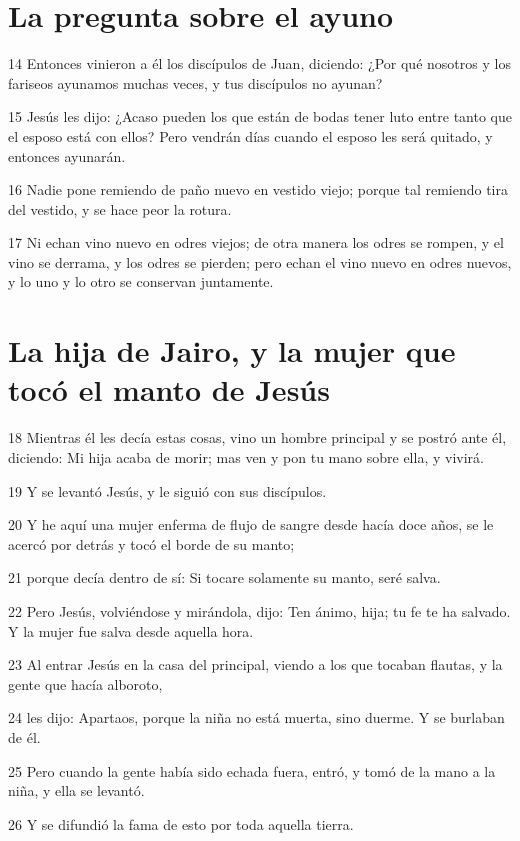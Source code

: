 \section*{La pregunta sobre el ayuno}

\par 14 Entonces vinieron a él los discípulos de Juan, diciendo: ¿Por qué nosotros y los fariseos ayunamos muchas veces, y tus discípulos no ayunan?
\par 15 Jesús les dijo: ¿Acaso pueden los que están de bodas tener luto entre tanto que el esposo está con ellos? Pero vendrán días cuando el esposo les será quitado, y entonces ayunarán.
\par 16 Nadie pone remiendo de paño nuevo en vestido viejo; porque tal remiendo tira del vestido, y se hace peor la rotura.
\par 17 Ni echan vino nuevo en odres viejos; de otra manera los odres se rompen, y el vino se derrama, y los odres se pierden; pero echan el vino nuevo en odres nuevos, y lo uno y lo otro se conservan juntamente.

\section*{La hija de Jairo, y la mujer que tocó el manto de Jesús}

\par 18 Mientras él les decía estas cosas, vino un hombre principal y se postró ante él, diciendo: Mi hija acaba de morir; mas ven y pon tu mano sobre ella, y vivirá.
\par 19 Y se levantó Jesús, y le siguió con sus discípulos.
\par 20 Y he aquí una mujer enferma de flujo de sangre desde hacía doce años, se le acercó por detrás y tocó el borde de su manto;
\par 21 porque decía dentro de sí: Si tocare solamente su manto, seré salva.
\par 22 Pero Jesús, volviéndose y mirándola, dijo: Ten ánimo, hija; tu fe te ha salvado. Y la mujer fue salva desde aquella hora.
\par 23 Al entrar Jesús en la casa del principal, viendo a los que tocaban flautas, y la gente que hacía alboroto,
\par 24 les dijo: Apartaos, porque la niña no está muerta, sino duerme. Y se burlaban de él.
\par 25 Pero cuando la gente había sido echada fuera, entró, y tomó de la mano a la niña, y ella se levantó.
\par 26 Y se difundió la fama de esto por toda aquella tierra.

